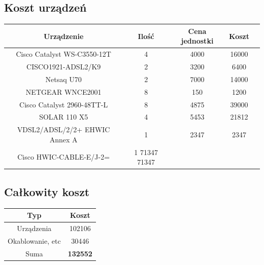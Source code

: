 \subsection{Koszt urządzeń}
\begin{center}
    \begin{tabular}{|c|c|c|c|c|}
    \hline
    Urządzenie &	Ilość&	Cena jednostki	& Koszt \\ \hline
Cisco Catalyst WS-C3550-12T &	4	&4000	&16000 \\ \hline
CISCO1921-ADSL2/K9	&2	&3200	&6400\\ \hline
Netsaq U70	&2	&7000	&14000\\ \hline
NETGEAR WNCE2001	&8	&150	&1200\\ \hline
Cisco Catalyst 2960-48TT-L	&8	&4875	&39000\\ \hline
SOLAR 110 X5 	&4	&5453	&21812\\ \hline
VDSL2/ADSL/2/2+ EHWIC Annex A&	1	&2347&	2347\\ \hline
Cisco HWIC-CABLE-E/J-2=	&1	71347	71347\\ \hline


\end{tabular}
\end{center}

\subsection{Całkowity koszt}
\begin{center}
    \begin{tabular}{|c|c|}
    \hline
 Typ & Koszt \\ \hline
 Urządzenia & 102106 \\ \hline
 Okablowanie, etc & 30446 \\ \hline
 Suma & \textbf{132552} \\ \hline
\end{tabular}
\end{center}